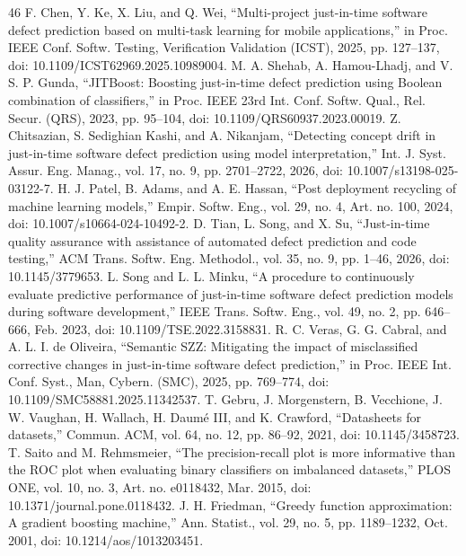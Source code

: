 \begin{thebibliography}{46}
 F. Chen, Y. Ke, X. Liu, and Q. Wei, ``Multi-project just-in-time software defect prediction based on multi-task learning for mobile applications,'' in Proc. IEEE Conf. Softw. Testing, Verification Validation (ICST), 2025, pp. 127--137, doi: \mbox{10.1109/ICST62969.2025.10989004}.
 M. A. Shehab, A. Hamou-Lhadj, and V. S. P. Gunda, ``JITBoost: Boosting just-in-time defect prediction using Boolean combination of classifiers,'' in Proc. IEEE 23rd Int. Conf. Softw. Qual., Rel. Secur. (QRS), 2023, pp. 95--104, doi: \mbox{10.1109/QRS60937.2023.00019}.
 Z. Chitsazian, S. Sedighian Kashi, and A. Nikanjam, ``Detecting concept drift in just-in-time software defect prediction using model interpretation,'' Int. J. Syst. Assur. Eng. Manag., vol. 17, no. 9, pp. 2701--2722, 2026, doi: \mbox{10.1007/s13198-025-03122-7}.
 H. J. Patel, B. Adams, and A. E. Hassan, ``Post deployment recycling of machine learning models,'' Empir. Softw. Eng., vol. 29, no. 4, Art. no. 100, 2024, doi: \mbox{10.1007/s10664-024-10492-2}.
 D. Tian, L. Song, and X. Su, ``Just-in-time quality assurance with assistance of automated defect prediction and code testing,'' ACM Trans. Softw. Eng. Methodol., vol. 35, no. 9, pp. 1--46, 2026, doi: \mbox{10.1145/3779653}.
 L. Song and L. L. Minku, ``A procedure to continuously evaluate predictive performance of just-in-time software defect prediction models during software development,'' IEEE Trans. Softw. Eng., vol. 49, no. 2, pp. 646--666, Feb. 2023, doi: \mbox{10.1109/TSE.2022.3158831}.
 R. C. Veras, G. G. Cabral, and A. L. I. de Oliveira, ``Semantic SZZ: Mitigating the impact of misclassified corrective changes in just-in-time software defect prediction,'' in Proc. IEEE Int. Conf. Syst., Man, Cybern. (SMC), 2025, pp. 769--774, doi: \mbox{10.1109/SMC58881.2025.11342537}.
 T. Gebru, J. Morgenstern, B. Vecchione, J. W. Vaughan, H. Wallach, H. Daum\'e III, and K. Crawford, ``Datasheets for datasets,'' Commun. ACM, vol. 64, no. 12, pp. 86--92, 2021, doi: 10.1145/3458723.
 T. Saito and M. Rehmsmeier, ``The precision-recall plot is more informative than the ROC plot when evaluating binary classifiers on imbalanced datasets,'' PLOS ONE, vol. 10, no. 3, Art. no. e0118432, Mar. 2015, doi: \mbox{10.1371/journal.pone.0118432}.
 J. H. Friedman, ``Greedy function approximation: A gradient boosting machine,'' Ann. Statist., vol. 29, no. 5, pp. 1189--1232, Oct. 2001, doi: \mbox{10.1214/aos/1013203451}.

\end{thebibliography}
